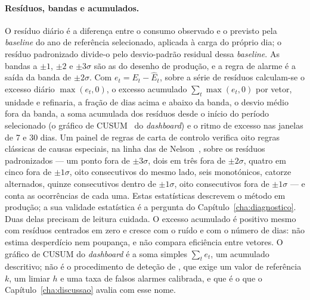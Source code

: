 \paragraph{Resíduos, bandas e acumulados.} O resíduo diário é a diferença
entre o consumo observado e o previsto pela \emph{baseline} do ano de
referência selecionado, aplicada à carga do próprio dia; o resíduo
padronizado divide-o pelo desvio-padrão residual dessa \emph{baseline}. As
bandas a $\pm1$, $\pm2$ e $\pm3\sigma$ são as do desenho de produção, e a
regra de alarme é a saída da banda de $\pm2\sigma$. Com $e_t = E_t - \hat E_t$, sobre a série de
resíduos calculam-se o excesso diário $\max(e_t,0)$, o
excesso acumulado $\sum_t \max(e_t,0)$ por vetor, unidade e refinaria, a fração de dias acima
e abaixo da banda, o desvio médio fora da banda, a soma acumulada dos
resíduos desde o início do período selecionado (o gráfico de CUSUM~\cite{Page1954} do
\emph{dashboard}) e o ritmo de excesso nas janelas de 7 e 30 dias. Um
painel de regras de carta de controlo verifica oito regras clássicas de
causas especiais, na linha das de Nelson~\cite{Nelson1984}, sobre os resíduos padronizados --- um ponto fora de $\pm3\sigma$, dois em
três fora de $\pm2\sigma$, quatro em cinco fora de $\pm1\sigma$, oito
consecutivos do mesmo lado, seis monotónicos, catorze alternados, quinze
consecutivos dentro de $\pm1\sigma$, oito consecutivos fora de
$\pm1\sigma$  --- e conta as ocorrências de cada uma.
 Estas estatísticas
descrevem o método em produção; a sua validade estatística é a pergunta
do Capítulo~\ref{cha:diagnostico}. Duas delas precisam de leitura cuidada.
O excesso acumulado é positivo mesmo com resíduos centrados em zero e cresce
com o ruído e com o número de dias: não estima desperdício nem poupança, e
não compara eficiência entre vetores. O gráfico de CUSUM do
\emph{dashboard} é a soma simples $\sum_t e_t$, um acumulado descritivo; não
é o procedimento de deteção de \textcite{Page1954}, que exige um valor de
referência $k$, um limiar $h$ e uma taxa de falsos alarmes calibrada, e que
é o que o Capítulo~\ref{cha:discussao} avalia com esse nome.

